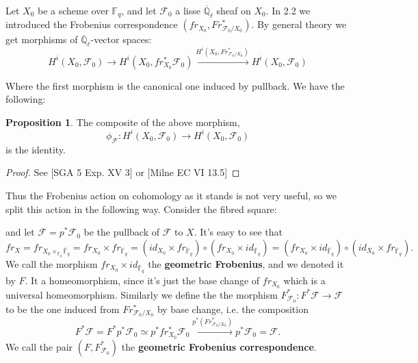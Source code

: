 \documentclass{ucbthesis}
\theoremstyle{definition}
\theoremstyle{theorem}
\newtheorem{prop}[thm]{Proposition}
\begin{document}
Let $X_0$ be a scheme over $\mathbb{F}_{q}$, and let $\mathcal{F}_0$ a lisse $\overline{\mathbb{Q}}_{\ell}$ sheaf on $X_0$. In 2.2 we introduced the Frobenius correspondence $(fr_{X_0},Fr_{\mathcal{F}_0/X_0}^{*})$. By general theory we get morphisms of $\overline{\mathbb{Q}}_\ell$-vector spaces:
$$H^{i}(X_0,\mathcal{F}_0)\rightarrow H^{i}(X_0,fr_{X_0}^{*}\mathcal{F}_0)\xrightarrow{H^{i}(X_0,Fr_{\mathcal{F}_0/X_0}^{*})} H^{i}(X_0,\mathcal{F}_0)$$

Where the first morphism is the canonical one induced by pullback. We have the following:

\begin{prop}
The composite of the above morphism, $$\phi_{\mathcal{F}}:H^{i}(X_0,\mathcal{F}_0)\rightarrow H^{i}(X_0,\mathcal{F}_0)$$ is the identity.
\end{prop}

\begin{proof}
See [SGA 5 Exp. XV 3] or [Milne EC VI 13.5]
\end{proof}

Thus the Frobenius action on cohomology as it stands is not very useful, so we split this action in the following way. Consider the fibred square:
\begin{center}
\end{center}

and let $\mathcal{F} = p^{*}\mathcal{F}_0$ be the pullback of $\mathcal{F}$ to $X$. It's easy to see that 
$$fr_{X} = fr_{X_0\times_{\mathbb{F}_{q}} \overline{\mathbb{F}}_{q}} = fr_{X_0}\times fr_{\overline{\mathbb{F}}_{q}} = (id_{X_0}\times fr_{\overline{\mathbb{F}}_{q}})\circ (fr_{X_0} \times id_{\overline{\mathbb{F}}_{q}}) = (fr_{X_0} \times id_{\overline{\mathbb{F}}_{q}}) \circ (id_{X_0}\times fr_{\overline{\mathbb{F}}_{q}}).$$
We call the morphism $fr_{X_0} \times id_{\overline{\mathbb{F}}_{q}}$ the \textbf{geometric Frobenius}, and we denoted it by $F$. It a homeomorphism, since it's just the base change of $fr_{X_{0}}$ which is a universal homeomorphism. Similarly we define the the morphism $F^{*}_{\mathcal{F}_{0}}:F^{*}\mathcal{F}\rightarrow \mathcal{F}$ to be the one induced from $Fr_{\mathcal{F}_0/X_0}^{*}$ by base change, i.e. the composition
$$F^{*}\mathcal{F} = F^{*}p^{*}\mathcal{F}_0 \simeq p^{*}fr^{*}_{X_0}\mathcal{F}_{0} \xrightarrow{p^{*}(Fr^{*}_{{\mathcal{F}_0/X_0}})} p^{*}\mathcal{F}_0 = \mathcal{F}.$$
We call the pair $(F,F^{*}_{\mathcal{F}_0})$ the \textbf{geometric Frobenius correspondence}. 
\end{document}
